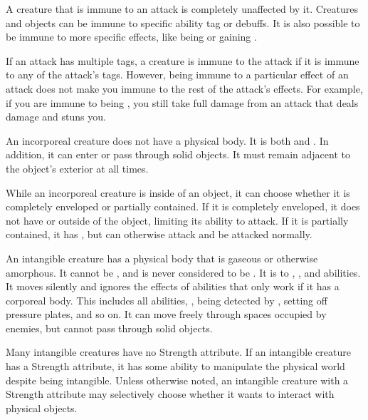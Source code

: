   A creature that is immune to an attack is completely unaffected by it.
  Creatures and objects can be immune to specific ability tag or debuffs.
  It is also possible to be immune to more specific effects, like being \grappled or gaining .

  If an attack has multiple tags, a creature is immune to the attack if it is immune to any of the attack's tags.
  However, being immune to a particular effect of an attack does not make you immune to the rest of the attack's effects.
  For example, if you are immune to being \stunned, you still take full damage from an attack that deals damage and stuns you.

  An incorporeal creature does not have a physical body.
  It is both  and .
  In addition, it can enter or pass through solid objects.
  It must remain adjacent to the object's exterior at all times.

  While an incorporeal creature is inside of an object, it can choose whether it is completely enveloped or partially contained.
  If it is completely enveloped, it does not have  or  outside of the object, limiting its ability to attack.
  If it is partially contained, it has , but can otherwise attack and be attacked normally.

  An intangible creature has a physical body that is gaseous or otherwise amorphous.
  It cannot be , and is never considered to be \squeezing.
  It is  to , \atCreation, and \atManifestation abilities.
  It moves silently and ignores the effects of abilities that only work if it has a corporeal body.
  This includes all  abilities, , being detected by , setting off pressure plates, and so on.
  It can move freely through spaces occupied by enemies, but cannot pass through solid objects.

  Many intangible creatures have no Strength attribute.
  If an intangible creature has a Strength attribute, it has some ability to manipulate the physical world despite being intangible.
  Unless otherwise noted, an intangible creature with a Strength attribute may selectively choose whether it wants to interact with physical objects.

